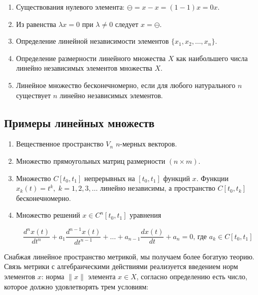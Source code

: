 \documentclass[12pt,a4paper,titlepage, oneside]{book}
\theoremstyle{definition}
\theoremstyle{plain}
\theoremstyle{remark}
\theoremstyle{remark}
\theoremstyle{remark}
\theoremstyle{plain}
\theoremstyle{plain}
\begin{document}
\begin{enumerate}

	\item Существования нулевого элемента: $\ominus=x-x=(1-1)x=0x$.

	\item Из равенства $\lambda x=0$ при $\lambda\ne0$ следует $x=\ominus$.

	\item Определение линейной независимости элементов $\{x_1,x_2, \ldots, x_n\}$.

	\item Определение размерности линейного множества $X$ как наибольшего числа линейно независимых элементов множества $X$.

	\item Линейное множество бесконечномерно, если для любого натурального $n$ существует $n$ линейно независимых элементов.

\end{enumerate}

\subsection*{Примеры линейных множеств}

\begin{enumerate}

	\item Вещественное пространство $V_n$ $n$-мерных векторов.

	\item Множество прямоугольных матриц размерности $(n\times m)$.

	\item Множество $C[t_0,t_1]$ непрерывных на $[t_0,t_1]$ функций $x$. Функции $x_k(t)=t^k,\; k=1,2,3,\ldots$ линейно независимы, а пространство $C[t_0,t_k]$ бесконечномерно.

	\item Множество решений $x\in C^n[t_0,t_1]$ уравнения

	\begin{equation*}
	\frac{d^nx(t)}{dt^n}+a_1\frac{d^{n-1}x(t)}{dt^{n-1}}+\ldots+a_{n-1}\frac{dx(t)}{dt}+a_n=0 \mbox{, где } a_k\in C[t_0,t_1]
	\end{equation*}

\end{enumerate}


Снабжая линейное пространство метрикой, мы получаем более богатую теорию. Связь метрики с алгебраическими действиями реализуется введением норм элементов $x$: норма $\lVert x\rVert$ элемента $x\in X$, согласно определению есть число, которое должно удовлетворять трем условиям:
\end{document}
